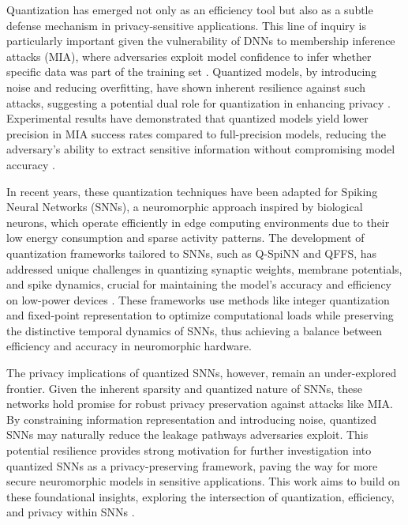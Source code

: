 Quantization has emerged not only as an efficiency tool but also as a subtle defense mechanism in privacy-sensitive applications. This line of inquiry is particularly important given the vulnerability of DNNs to membership inference attacks (MIA), where adversaries exploit model confidence to infer whether specific data was part of the training set \cite{kowalski2022towards}. Quantized models, by introducing noise and reducing overfitting, have shown inherent resilience against such attacks, suggesting a potential dual role for quantization in enhancing privacy \cite{famili2023deep}. Experimental results have demonstrated that quantized models yield lower precision in MIA success rates compared to full-precision models, reducing the adversary’s ability to extract sensitive information without compromising model accuracy \cite{wei2024q, hu2021quantized}.

In recent years, these quantization techniques have been adapted for Spiking Neural Networks (SNNs), a neuromorphic approach inspired by biological neurons, which operate efficiently in edge computing environments due to their low energy consumption and sparse activity patterns. The development of quantization frameworks tailored to SNNs, such as Q-SpiNN and QFFS, has addressed unique challenges in quantizing synaptic weights, membrane potentials, and spike dynamics, crucial for maintaining the model’s accuracy and efficiency on low-power devices \cite{putra2021q, li2022quantization}. These frameworks use methods like integer quantization and fixed-point representation to optimize computational loads while preserving the distinctive temporal dynamics of SNNs, thus achieving a balance between efficiency and accuracy in neuromorphic hardware.

The privacy implications of quantized SNNs, however, remain an under-explored frontier. Given the inherent sparsity and quantized nature of SNNs, these networks hold promise for robust privacy preservation against attacks like MIA. By constraining information representation and introducing noise, quantized SNNs may naturally reduce the leakage pathways adversaries exploit. This potential resilience provides strong motivation for further investigation into quantized SNNs as a privacy-preserving framework, paving the way for more secure neuromorphic models in sensitive applications. This work aims to build on these foundational insights, exploring the intersection of quantization, efficiency, and privacy within SNNs \cite{schaefer2020quantizing, stock2019and, kowalski2022towards}.



